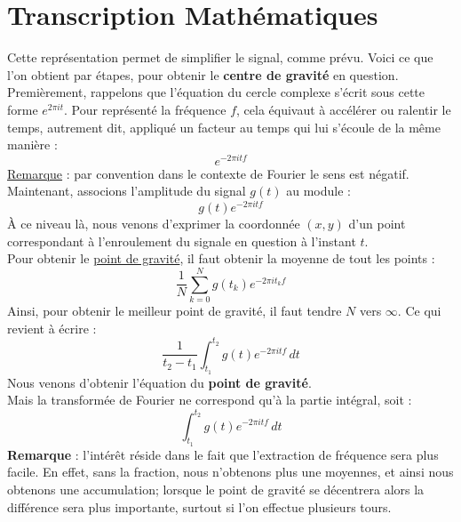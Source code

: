 \documentclass[a4paper]{book}
\begin{document}
\section{Transcription Mathématiques}

Cette représentation permet de
simplifier le signal, comme prévu. Voici ce que l'on obtient par étapes, pour
obtenir le \textbf{centre de gravité} en question. \\
Premièrement, rappelons que l'équation du cercle complexe s'écrit sous cette
forme $e^{2 \pi i t}$. Pour représenté la fréquence $f$, cela équivaut à accélérer
ou ralentir le temps, autrement dit, appliqué un facteur au temps qui lui
s'écoule de la même manière :
\begin{equation}
	e^{- 2 \pi i t f}
\end{equation}
\underline{Remarque} : par convention dans le contexte de Fourier le sens est
négatif.\\
Maintenant, associons l'amplitude du signal $g(t)$ au module :
\begin{equation}
	g(t) e^{- 2 \pi i t f}
\end{equation}
À ce niveau là, nous venons d'exprimer la coordonnée $(x,y)$ d'un point
correspondant à l'enroulement du signale en question à l'instant $t$.\\
Pour obtenir le \underline{point de gravité}, il faut obtenir la moyenne de tout
les points :
\begin{equation}
	\frac{1}{N} \sum_{k=0}^{N} g(t_{k}) e^{- 2 \pi i t_{k} f}
\end{equation}
Ainsi, pour obtenir le meilleur point de gravité, il faut tendre $N$ vers
$\infty$. Ce qui revient à écrire :
\begin{equation}
	\frac{1}{t_{2} - t_{1}} \int_{t_{1}}^{t_{2}} g(t) e^{- 2 \pi i t f} \, dt
\end{equation}
Nous venons d'obtenir l'équation du \textbf{point de gravité}.\\
Mais la transformée de Fourier ne correspond qu'à la partie intégral, soit :
\begin{equation}
	\int_{t_{1}}^{t_{2}} g(t) e^{- 2 \pi i t f} \, dt
\end{equation}
\textbf{Remarque} : l'intérêt réside dans le fait que l'extraction de fréquence
sera plus facile. En effet, sans la fraction, nous n'obtenons plus une moyennes,
et ainsi nous obtenons une accumulation; lorsque le point de gravité se
décentrera alors la différence sera plus importante, surtout si l'on effectue
plusieurs tours.
\end{document}
